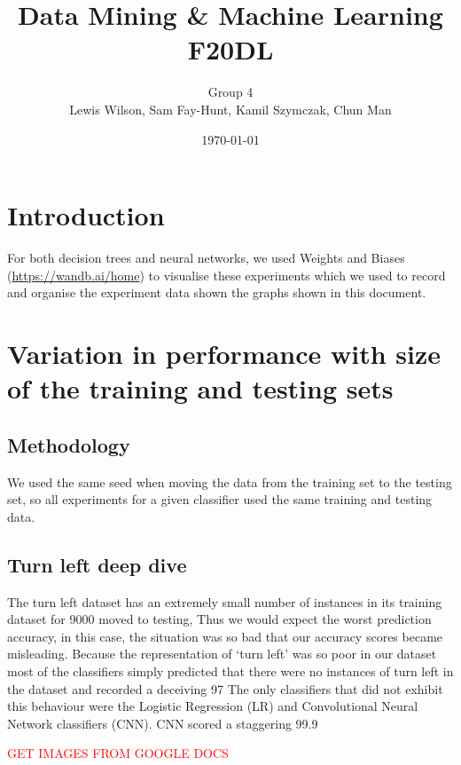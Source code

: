 \documentclass[11pt]{article}
\begin{document}
\title{\huge Data Mining \& Machine Learning F20DL} 
\author{Group 4\\Lewis Wilson, Sam Fay-Hunt, Kamil Szymczak, Chun Man }
\date{\today}
\maketitle

\newpage
\tableofcontents
\thispagestyle{empty}
\pagebreak
\setcounter{page}{1}
\newpage
\section{Introduction}
For both decision trees and neural networks, we used Weights and Biases (\url{https://wandb.ai/home}) to visualise these experiments which we used to record and organise the experiment data shown the graphs shown in this document.


\newpage
\section{Variation in performance with size of the training and testing sets}
\subsection{Methodology}
We used the same seed when moving the data from the training set to the testing set, so all experiments for a given classifier used the same training and testing data.
\subsection{Turn left deep dive}
The turn left dataset has an extremely small number of instances in its training dataset for 9000 moved to testing, Thus we would expect the worst prediction accuracy, in this case, the situation was so bad that our accuracy scores became misleading. Because the representation of ‘turn left’ was so poor in our dataset most of the classifiers simply predicted that there were no instances of turn left in the dataset and recorded a deceiving 97%
The only classifiers that did not exhibit this behaviour were the Logistic Regression (LR) and Convolutional Neural Network classifiers (CNN). CNN scored a staggering 99.9%
\par
\textcolor{red}{\huge {GET IMAGES FROM GOOGLE DOCS}}
\end{document}
